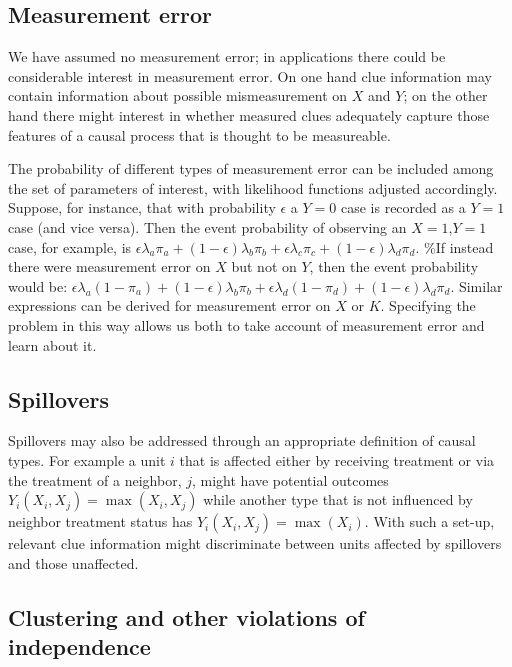 \documentclass[12pt,]{book}
\begin{document}
\hypertarget{measurement-error}{%
\subsection{Measurement error}\label{measurement-error}}

We have assumed no measurement error; in applications there could be considerable interest in measurement error. On one hand clue information may contain information about possible mismeasurement on \(X\) and \(Y\); on the other hand there might interest in whether measured clues adequately capture those features of a causal process that is thought to be measureable.

The probability of different types of measurement error can be included among the set of parameters of interest, with likelihood functions adjusted accordingly. Suppose, for instance, that with probability \(\epsilon\) a \(Y=0\) case is recorded as a \(Y=1\) case (and vice versa). Then the event probability of observing an \(X=1\),\(Y=1\) case, for example, is \(\epsilon \lambda_a \pi_a + (1-\epsilon) \lambda_b \pi_b + \epsilon \lambda_c \pi_c + (1-\epsilon) \lambda_d \pi_d\). \%If instead there were measurement error on \(X\) but not on \(Y\), then the event probability would be: \(\epsilon \lambda_a (1-\pi_a) + (1-\epsilon) \lambda_b \pi_b + \epsilon \lambda_d (1-\pi_d) + (1-\epsilon) \lambda_d \pi_d\).
Similar expressions can be derived for measurement error on \(X\) or \(K\). Specifying the problem in this way allows us both to take account of measurement error and learn about it.

\hypertarget{spillovers}{%
\subsection{Spillovers}\label{spillovers}}

Spillovers may also be addressed through an appropriate definition of causal types. For example a unit \(i\) that is affected either by receiving treatment or via the treatment of a neighbor, \(j\), might have potential outcomes \(Y_i(X_i,X_j)=\max(X_i,X_j)\) while another type that is not influenced by neighbor treatment status has \(Y_i(X_i,X_j)=\max(X_i)\). With such a set-up, relevant clue information might discriminate between units affected by spillovers and those unaffected.

\hypertarget{clustering-and-other-violations-of-independence}{%
\subsection{Clustering and other violations of independence}\label{clustering-and-other-violations-of-independence}}
\end{document}
